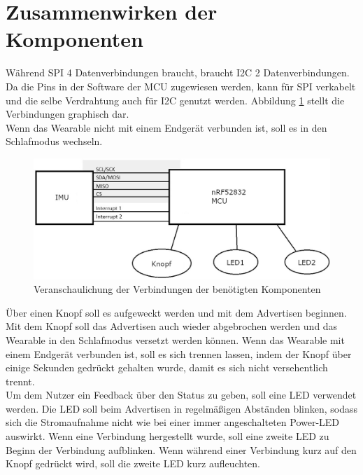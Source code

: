 \section{Zusammenwirken der Komponenten}
Während SPI 4 Datenverbindungen braucht, braucht I2C 2 Datenverbindungen.
Da die Pins in der Software der MCU zugewiesen werden, kann für SPI verkabelt und die selbe Verdrahtung auch für I2C genutzt werden.
Abbildung \ref{fig:abstract_schema} stellt die Verbindungen graphisch dar.\\
Wenn das Wearable nicht mit einem Endgerät verbunden ist, soll es in den Schlafmodus wechseln.
\begin{figure}[b]
	\centering
	\includegraphics[width=0.9\linewidth]{res/schemaAbstrakt.jpg}
	\caption{Veranschaulichung der Verbindungen der benötigten Komponenten}
	\label{fig:abstract_schema}
\end{figure}
Über einen Knopf soll es aufgeweckt werden und mit dem Advertisen beginnen.
Mit dem Knopf soll das Advertisen auch wieder abgebrochen werden und das Wearable in den Schlafmodus versetzt werden können.
Wenn das Wearable mit einem Endgerät verbunden ist, soll es sich trennen lassen, indem der Knopf über einige Sekunden gedrückt gehalten wurde, damit es sich nicht versehentlich trennt.\\
Um dem Nutzer ein Feedback über den Status zu geben, soll eine LED verwendet werden.
Die LED soll beim Advertisen in regelmäßigen Abständen blinken, sodass sich die Stromaufnahme nicht wie bei einer immer angeschalteten Power-LED auswirkt.
Wenn eine Verbindung hergestellt wurde, soll eine zweite LED zu Beginn der Verbindung aufblinken.
Wenn während einer Verbindung kurz auf den Knopf gedrückt wird, soll die zweite LED kurz aufleuchten.
